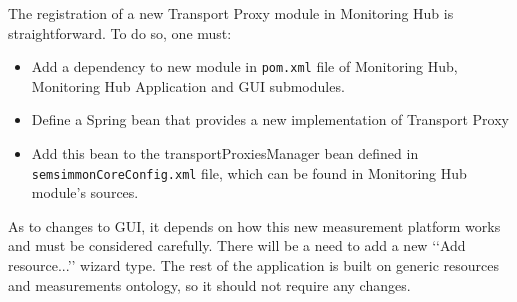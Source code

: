 The registration of a new Transport Proxy module in Monitoring Hub is straightforward. To do so, one must:

\begin{itemize}

\item Add a dependency to new module in \texttt{pom.xml} file of Monitoring Hub, Monitoring Hub Application and GUI submodules.

\item Define a Spring bean that provides a new implementation of Transport Proxy

\item Add this bean to the transportProxiesManager bean defined in \texttt{semsimmonCoreConfig.xml} file, which can be found in Monitoring Hub module\rq{}s sources.

\end{itemize}

As to changes to GUI, it depends on how this new measurement platform works and must be considered carefully. There will be a need to add a new \lq\lq{}Add resource...\rq\rq{} wizard type. The rest of the application is built on generic resources and measurements ontology, so it should not require any changes.

